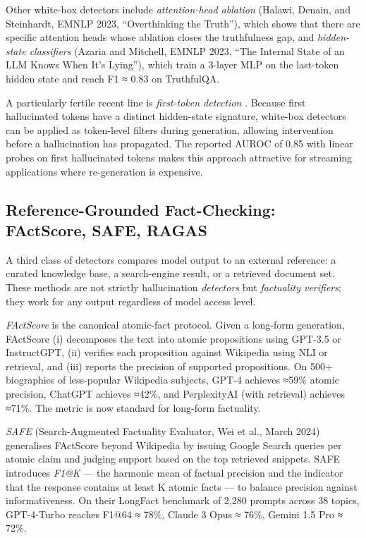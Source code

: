 \documentclass{article}
\begin{document}
Other white-box detectors include \emph{attention-head ablation} (Halawi, Denain, and Steinhardt, EMNLP 2023, ``Overthinking the Truth''), which shows that there are specific attention heads whose ablation closes the truthfulness gap, and \emph{hidden-state classifiers} (Azaria and Mitchell, EMNLP 2023, ``The Internal State of an LLM Knows When It's Lying''), which train a 3-layer MLP on the last-token hidden state and reach F1 ≈ 0.83 on TruthfulQA.

A particularly fertile recent line is \emph{first-token detection} \citep{snel2025firsthallucination}. Because first hallucinated tokens have a distinct hidden-state signature, white-box detectors can be applied as token-level filters during generation, allowing intervention before a hallucination has propagated. The reported AUROC of 0.85 with linear probes on first hallucinated tokens makes this approach attractive for streaming applications where re-generation is expensive.

\subsection{Reference-Grounded Fact-Checking: FActScore, SAFE, RAGAS}\label{reference-grounded-fact-checking-factscore-safe-ragas}

A third class of detectors compares model output to an external reference: a curated knowledge base, a search-engine result, or a retrieved document set. These methods are not strictly hallucination \emph{detectors} but \emph{factuality verifiers}; they work for any output regardless of model access level.

\emph{FActScore} \citep{min2023factscorefinegrain} is the canonical atomic-fact protocol. Given a long-form generation, FActScore (i) decomposes the text into atomic propositions using GPT-3.5 or InstructGPT, (ii) verifies each proposition against Wikipedia using NLI or retrieval, and (iii) reports the precision of supported propositions. On 500+ biographies of less-popular Wikipedia subjects, GPT-4 achieves ≈59\% atomic precision, ChatGPT achieves ≈42\%, and PerplexityAI (with retrieval) achieves ≈71\%. The metric is now standard for long-form factuality.

\emph{SAFE} (Search-Augmented Factuality Evaluator, Wei et al., March 2024) generalises FActScore beyond Wikipedia by issuing Google Search queries per atomic claim and judging support based on the top retrieved snippets. SAFE introduces \emph{F1@K} --- the harmonic mean of factual precision and the indicator that the response contains at least K atomic facts --- to balance precision against informativeness. On their LongFact benchmark of 2,280 prompts across 38 topics, GPT-4-Turbo reaches F1@64 ≈ 78\%, Claude 3 Opus ≈ 76\%, Gemini 1.5 Pro ≈ 72\%.
\end{document}
